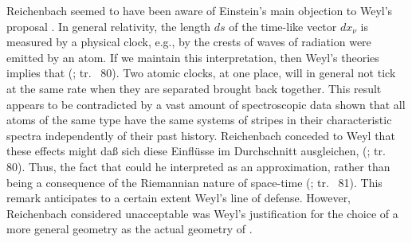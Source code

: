 \documentclass[draft]{article}
\newcommand{\rhp}[2]{(\cite[#1]{Reichenbach1920a}; tr.\ \citeyear{Reichenbach1969} #2)\xspace}
\begin{document}
Reichenbach seemed to have been aware of Einstein's main objection to Weyl's proposal \citep[see]{Einstein1918b}. In general relativity, the length $ds$ of the time-like vector $dx_\nu$ is measured by a physical clock, e.g., by the crests of waves of radiation were emitted by an atom. If we maintain this interpretation, then Weyl's theories implies that  \rhp{77}{80}. Two atomic clocks, at one place, will in general not tick at the same rate when they are separated brought back together. This result appears to be contradicted by a vast amount of spectroscopic data shown that all atoms of the same type have the same systems of stripes in their characteristic spectra independently of their past history. Reichenbach conceded to Weyl that these effects might daß sich diese Einflüsse im Durchschnitt ausgleichen, \rhp{77}{80}. Thus, the fact that  could he interpreted as an approximation, rather than being a consequence of the Riemannian nature of space-time \rhp{77}{81}. This remark anticipates to a certain extent Weyl's line of defense. However, Reichenbach considered unacceptable was Weyl's justification for the choice of a more general geometry as the actual geometry of \spti.
\end{document}
